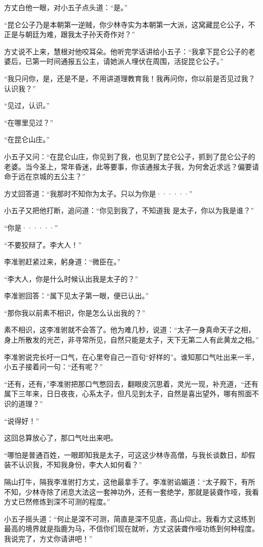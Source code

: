 方丈白他一眼，对小五子点头道：“是。”

“昆仑公子乃是本朝第一逆贼，你少林寺实为本朝第一大派，这窝藏昆仑公子，不正是与朝廷为难，跟我太子孙天奇作对？”

方丈说不上来，慧根对他咬耳朵。他听完学话讲给小五子：“我拿下昆仑公子的老婆后，已第一时间通报五公主，请她派人埋伏在周围，活捉昆仑公子。”

“我只问你，是，还是不是，不用讲道理教育我！我再问你，你以前是否见过我？认识我？”

“见过，认识。”

“在哪里见过？”

“在昆仑山庄。”

小五子又问：“在昆仑山庄，你见到了我，也见到了昆仑公子，抓到了昆仑公子的老婆。当今圣上，常年昏迷，此等要事，你该通报太子我，为何舍近求远？偏要请命于远在京城的五公主？”

方丈回答道：“我那时不知你为太子。只以为你是······”

小五子又把他打断，追问道：“你见到我了，不知道我
是太子，你以为我是谁？”

“你是······”

“不要狡辩了。李大人！”

李准驸赶紧过来，躬身道：“微臣在。”

“李大人，你是什么时候认出我是太子的？”

李准驸回答：“属下见太子第一眼，便已认出。”

“那你我以前素不相识，你是怎么认出我的？”

素不相识，这李准驸就不会答了。他为难几秒，说道：“太子一身真命天子之相，身上所散发的光芒，非寻常所见，自然只能是太子，天下无第二人有此黄龙之相。”

李准驸说完长吁一口气，在心里夸自己一百句“好样的”。谁知那口气吐出来一半，小五子接着问一句：“还有呢？”

“还有，还有，”李准驸把那口气憋回去，翻眼皮沉思着，灵光一现，补充道，“还有属下三年来，日日夜夜，心系太子，但凡见到太子，自然是喜出望外，哪有照面不识的道理？”

“说得好！”

这回总算放心了，那口气吐出来吧。

“哪怕是普通百姓，一眼即知我是太子，可这这少林寺高僧，与我长谈数日，却假装不认识我，不知我身份，李大人如何看？”

隔山打牛，隔我李准驸打方丈，这他最拿手了。李准驸谄媚道：“太子殿下，有所不知，少林寺除了闭息大法这一套神功外，还有一套绝学，那就是装聋作哑，我看方丈已然修炼到深不可测的程度。”

小五子摇头道：“何止是深不可测，简直是深不见底，高山仰止。我看方丈这练到最高的境界就是指鹿为马，不信你们现在就听，方丈这装聋作哑功练到何种程度。我说完了，方丈你请讲吧！”

